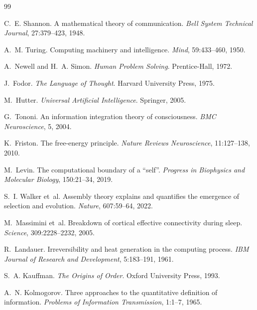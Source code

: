 \documentclass[11pt,letterpaper]{article}
\begin{document}
\begin{thebibliography}{99}

C.~E. Shannon.
\newblock A mathematical theory of communication.
\newblock \emph{Bell System Technical Journal}, 27:379--423, 1948.

A.~M. Turing.
\newblock Computing machinery and intelligence.
\newblock \emph{Mind}, 59:433--460, 1950.

A.~Newell and H.~A. Simon.
\newblock \emph{Human Problem Solving}.
\newblock Prentice-Hall, 1972.

J.~Fodor.
\newblock \emph{The Language of Thought}.
\newblock Harvard University Press, 1975.

M.~Hutter.
\newblock \emph{Universal Artificial Intelligence}.
\newblock Springer, 2005.

G.~Tononi.
\newblock An information integration theory of consciousness.
\newblock \emph{BMC Neuroscience}, 5, 2004.

K.~Friston.
\newblock The free-energy principle.
\newblock \emph{Nature Reviews Neuroscience}, 11:127--138, 2010.

M.~Levin.
\newblock The computational boundary of a ``self''.
\newblock \emph{Progress in Biophysics and Molecular Biology}, 150:21--34, 2019.

S.~I. Walker et~al.
\newblock Assembly theory explains and quantifies the emergence of selection and evolution.
\newblock \emph{Nature}, 607:59--64, 2022.

M.~Massimini et~al.
\newblock Breakdown of cortical effective connectivity during sleep.
\newblock \emph{Science}, 309:2228--2232, 2005.

R.~Landauer.
\newblock Irreversibility and heat generation in the computing process.
\newblock \emph{IBM Journal of Research and Development}, 5:183--191, 1961.

S.~A. Kauffman.
\newblock \emph{The Origins of Order}.
\newblock Oxford University Press, 1993.

A.~N. Kolmogorov.
\newblock Three approaches to the quantitative definition of information.
\newblock \emph{Problems of Information Transmission}, 1:1--7, 1965.

\end{thebibliography}
\end{document}
